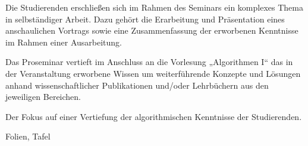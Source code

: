 \begin{course}
\begin{learningoutcomes}
Die Studierenden erschließen sich im Rahmen des Seminars ein komplexes Thema in selbständiger Arbeit. Dazu gehört die Erarbeitung und Präsentation eines anschaulichen Vortrags sowie eine Zusammenfassung der erworbenen Kenntnisse im Rahmen einer Ausarbeitung.


\end{learningoutcomes}

\begin{content}
Das Proseminar vertieft im Anschluss an die Vorlesung „Algorithmen I“ das in der Veranstaltung erworbene Wissen um weiterführende Konzepte und Lösungen anhand wissenschaftlicher Publikationen und/oder Lehrbüchern aus den jeweiligen Bereichen.

 

Der Fokus auf einer Vertiefung der algorithmischen Kenntnisse der Studierenden.


\end{content}

\begin{media}Folien, Tafel

\end{media}





\end{course}